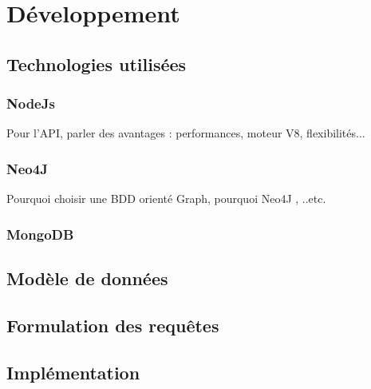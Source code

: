 	\chapter{Développement}
		\section{Technologies utilisées}
		\subsection{NodeJs}
			Pour l'API, parler des avantages : performances, moteur V8, flexibilités...  
		\subsection{Neo4J}
			Pourquoi choisir une BDD orienté Graph, pourquoi Neo4J , ..etc.
		\subsection{MongoDB}
		
	\section{Modèle de données}
	\section{Formulation des requêtes}
	\section{Implémentation}